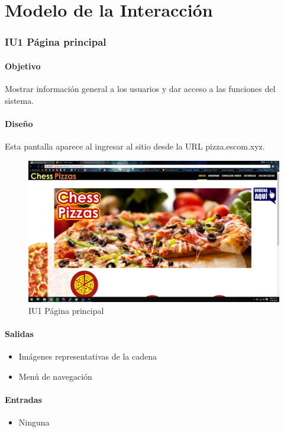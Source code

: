 \documentclass[oneside,10pt]{book}
\begin{document}
\chapter{Modelo de la Interacción}

\subsection{IU1 Página principal}

\subsubsection{Objetivo}
Mostrar información general a los usuarios y dar acceso a las funciones del sistema.

\subsubsection{Diseño}
Esta pantalla aparece al ingresar al sitio desde la URL pizza.escom.xyz.

\begin{figure}[htbp!]
	\centering
	\includegraphics[width=1\textwidth]{img/principal}
	\caption{IU1 Página principal}
\end{figure}


\subsubsection{Salidas}
\begin{itemize} 
	\item Imágenes representativas de la cadena
	\item Menú de navegación
\end{itemize}
\subsubsection{Entradas}
\begin{itemize}
	\item Ninguna
\end{itemize}
\end{document}
